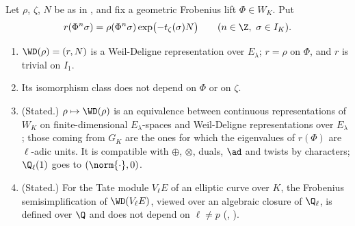 \begin{theorem}\label{thm:local:wd-equivalence}
Let $\rho$, $\zeta$, $N$ be as in , and fix a geometric Frobenius lift $\Phi\in W_K$. Put
\[
r(\Phi^n\sigma)=\rho(\Phi^n\sigma)\exp\bigl(-t_\zeta(\sigma)N\bigr)\qquad(n\in\Z,\ \sigma\in I_K).
\]
\begin{enumerate}[label=(\roman*)]
\item $\WD(\rho)=(r,N)$ is a Weil-Deligne representation over $E_\lambda$; $r=\rho$ on $\Phi$, and $r$ is trivial on $I_1$.
\item Its isomorphism class does not depend on $\Phi$ or on $\zeta$.
\item (Stated.) $\rho\mapsto\WD(\rho)$ is an equivalence between continuous representations of $W_K$ on finite-dimensional $E_\lambda$-spaces and Weil-Deligne
representations over $E_\lambda$; those coming from $G_K$ are the ones for which the eigenvalues of $r(\Phi)$ are $\ell$-adic units. It is compatible with
$\oplus$, $\otimes$, duals, $\ad$ and twists by characters; $\Q_\ell(1)$ goes to $(\norm{\cdot},0)$.
\item (Stated.) For the Tate module $V_\ell E$ of an elliptic curve over $K$, the Frobenius semisimplification of $\WD(V_\ell E)$, viewed over
an algebraic closure of $\Q_\ell$, is defined over $\Q$ and does not depend on $\ell\ne p$ (, ).
\end{enumerate}
\end{theorem}

